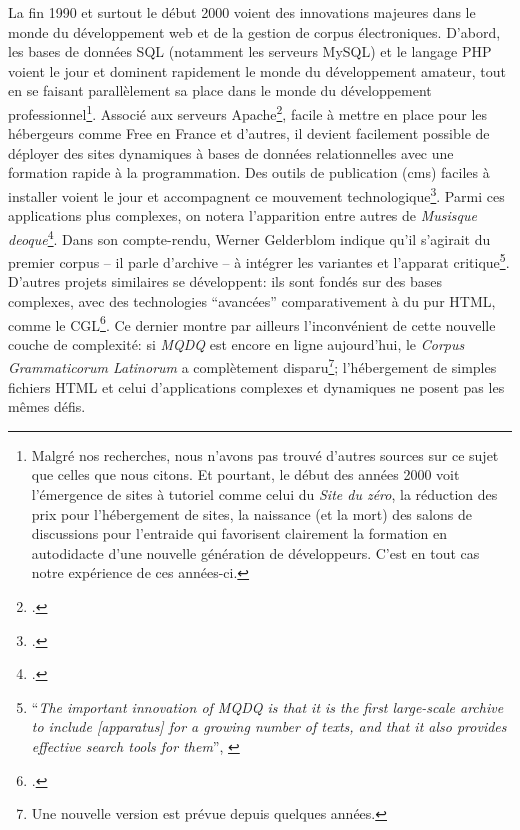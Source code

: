 La fin 1990 et surtout le début 2000 voient des innovations majeures dans le monde du développement web et de la gestion de corpus électroniques. D'abord, les bases de données SQL (notamment les serveurs MySQL) et le langage PHP voient le jour et dominent rapidement le monde du développement amateur, tout en se faisant parallèlement sa place dans le monde du développement professionnel\footnote{Malgré nos recherches, nous n'avons pas trouvé d'autres sources sur ce sujet que celles que nous citons. Et pourtant, le début des années 2000 voit l'émergence de sites à tutoriel comme celui du \textit{Site du zéro}, la réduction des prix pour l'hébergement de sites, la naissance (et la mort) des salons de discussions pour l'entraide qui favorisent clairement la formation en autodidacte d'une nouvelle génération de développeurs. C'est en tout cas notre expérience de ces années-ci.}. Associé aux serveurs Apache\footcite{smith_lamp_nodate}, facile à mettre en place pour les hébergeurs comme Free en France et d'autres, il devient facilement possible de déployer des sites dynamiques à bases de données relationnelles avec une formation rapide à la programmation. Des outils de publication (\acrlong{cms}) faciles à installer voient le jour et accompagnent ce mouvement technologique\footcite{purer_php_nodate}. Parmi ces applications plus complexes, on notera l'apparition entre autres de \textit{Musisque deoque}\footcite{gelderblom_musisque_2008}. Dans son compte-rendu, Werner Gelderblom indique qu'il s'agirait du premier corpus -- il parle d'archive -- à intégrer les variantes et l'apparat critique\footnote{``\textit{The important innovation of MQDQ is that it is the first large-scale archive to include [apparatus] for a growing number of texts, and that it also provides effective search tools for them}'', \cite[p.233]{gelderblom_musisque_2008}}. D'autres projets similaires se développent: ils sont fondés sur des bases complexes, avec des technologies \enquote{avancées} comparativement à du pur HTML, comme le CGL\footcite{garcea_corpus_2010}. Ce dernier montre par ailleurs l'inconvénient de cette nouvelle couche de complexité: si \textit{MQDQ} est encore en ligne aujourd'hui, le \textit{Corpus Grammaticorum Latinorum} a complètement disparu\footnote{Une nouvelle version est prévue depuis quelques années.}; l'hébergement de simples fichiers HTML et celui d'applications complexes et dynamiques ne posent pas les mêmes défis.

